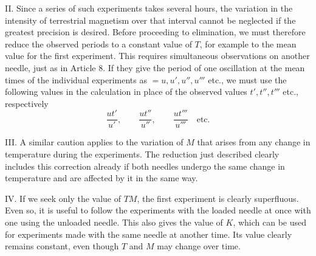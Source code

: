II. Since a series of such experiments takes several hours, the variation in the intensity of terrestrial magnetism over that interval cannot be neglected if the greatest precision is desired. Before proceeding to elimination, we must therefore reduce the observed periods to a constant value of $T$, for example to the mean value for the first experiment. This requires simultaneous observations on another needle, just as in Article 8. If they give the period of one oscillation at the mean times of the individual experiments as $=u,u',u'',u'''$ etc., we must use the following values in the calculation in place of the observed values $t',t'',t'''$ etc., respectively
\[
\frac{ut'}{u'},\qquad\frac{ut''}{u''},\qquad\frac{ut'''}{u'''}\quad\text{etc.}
\]

III. A similar caution applies to the variation of $M$ that arises from any change in temperature during the experiments. The reduction just described clearly includes this correction already if both needles undergo the same change in temperature and are affected by it in the same way.

IV. If we seek only the value of $TM$, the first experiment is clearly superfluous. Even so, it is useful to follow the experiments with the loaded needle at once with one using the unloaded needle. This also gives the value of $K$, which can be used for experiments made with the same needle at another time. Its value clearly remains constant, even though $T$ and $M$ may change over time.
